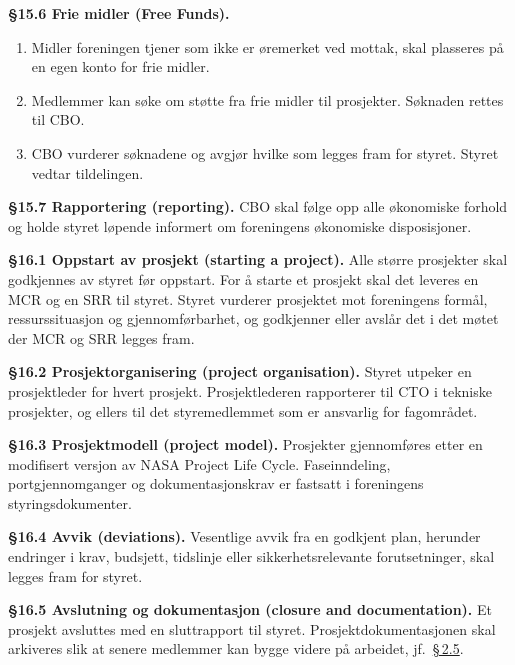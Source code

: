\documentclass{../../../Common/Latex/Templates/rapport}
\begin{document}
\textbf{\S 15.6 Frie midler (Free Funds).}\label{nbylaw:15.6}
\begin{enumerate}
  \item Midler foreningen tjener som ikke er øremerket ved mottak, skal plasseres p\r{a} en egen konto for frie midler.
  \item Medlemmer kan søke om støtte fra frie midler til prosjekter. Søknaden rettes til CBO.
  \item CBO vurderer søknadene og avgjør hvilke som legges fram for styret. Styret vedtar tildelingen.
\end{enumerate}

\textbf{\S 15.7 Rapportering (reporting).}\label{nbylaw:15.7} CBO skal følge opp alle økonomiske forhold og holde styret løpende informert om foreningens økonomiske disposisjoner.

\label{nbylaw:16}
\textbf{\S 16.1 Oppstart av prosjekt (starting a project).}\label{nbylaw:16.1} Alle større prosjekter skal godkjennes av styret før oppstart. For \r{a} starte et prosjekt skal det leveres en MCR og en SRR til styret. Styret vurderer prosjektet mot foreningens form\r{a}l, ressurssituasjon og gjennomførbarhet, og godkjenner eller avsl\r{a}r det i det møtet der MCR og SRR legges fram.

\textbf{\S 16.2 Prosjektorganisering (project organisation).}\label{nbylaw:16.2} Styret utpeker en prosjektleder for hvert prosjekt. Prosjektlederen rapporterer til CTO i tekniske prosjekter, og ellers til det styremedlemmet som er ansvarlig for fagomr\r{a}det.

\textbf{\S 16.3 Prosjektmodell (project model).}\label{nbylaw:16.3} Prosjekter gjennomføres etter en modifisert versjon av NASA Project Life Cycle. Faseinndeling, portgjennomganger og dokumentasjonskrav er fastsatt i foreningens styringsdokumenter.

\textbf{\S 16.4 Avvik (deviations).}\label{nbylaw:16.4} Vesentlige avvik fra en godkjent plan, herunder endringer i krav, budsjett, tidslinje eller sikkerhetsrelevante forutsetninger, skal legges fram for styret.

\textbf{\S 16.5 Avslutning og dokumentasjon (closure and documentation).}\label{nbylaw:16.5} Et prosjekt avsluttes med en sluttrapport til styret. Prosjektdokumentasjonen skal arkiveres slik at senere medlemmer kan bygge videre p\r{a} arbeidet, jf.\ \hyperref[nbylaw:2.5]{\S\,2.5}.

\end{document}
